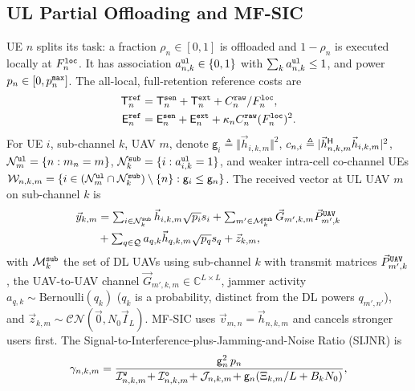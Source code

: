 \documentclass[journal]{IEEEtran}
\begin{document}
\subsection{UL Partial Offloading and MF-SIC}
\label{sec:ul}
UE $n$ splits its task: a fraction $\rho_n\in[0,1]$ is offloaded and $1-\rho_n$ is executed locally at $F_n^{\tt loc}$. It has association $a_{n,k}^{\tt ul}\in\{0,1\}$ with $\sum_k a_{n,k}^{\tt ul}\le 1$, and power $p_n\in[0,p_n^{\tt max}]$. The all-local, full-retention reference costs are
\begin{align}
\mathsf{T}_n^{\tt ref}&=\mathsf{T}_n^{\tt sen}+\mathsf{T}_n^{\tt ext}+C_n^{\tt raw}/F_n^{\tt loc},
\label{eq:ref}\\
\mathsf{E}_n^{\tt ref}&=\mathsf{E}_n^{\tt sen}+\mathsf{E}_n^{\tt ext}+\kappa_n C_n^{\tt raw}(F_n^{\tt loc})^2 .
\nonumber
\end{align}
{For UE $i$, sub-channel $k$, UAV $m$, denote $\mathsf{g}_i\triangleq\Vert\vec{h}_{i,k,m}\Vert^2$, $c_{n,i}\triangleq|\vec{h}_{n,k,m}^{\sf H}\vec{h}_{i,k,m}|^2$, 
$\mathcal{N}_m^{\tt ul}=\{n:m_n=m\}$,
$\mathcal{N}_k^{\tt sub}=\{i:a_{i,k}^{\tt ul}=1\}$, and weaker intra-cell co-channel UEs $\mathcal{W}_{n,k,m}=\{i\in(\mathcal{N}_m^{\tt ul}\cap\mathcal{N}_k^{\tt sub})\setminus\{n\}:\mathsf{g}_i\le\mathsf{g}_n\}$.}
The received vector at UL UAV $m$ on sub-channel $k$ is
\begin{equation}
\begin{aligned}
\textstyle\vec{y}_{k,m}&=\textstyle\sum_{i\in\mathcal{N}_k^{\tt sub}}\vec{h}_{i,k,m}\sqrt{p_i}s_i+\sum_{m'\in\mathcal{M}_k^{\tt sub}}\vec{G}_{m',k,m}\vec{P}_{m',k}^{\tt UAV}\\
&\textstyle+\sum_{q\in\mathcal{Q}}a_{q,k}\vec{h}_{q,k,m}\sqrt{p_q}s_q+\vec{z}_{k,m},
\end{aligned}
\label{eq:ul_y}
\end{equation}
{with $\mathcal{M}_k^{\tt sub}$ the set of DL UAVs using sub-channel $k$ with transmit matrices $\vec{P}_{m',k}^{\tt UAV}$}, the UAV-to-UAV channel $\vec{G}_{m',k,m}\in\mathbb{C}^{L\times L}$, jammer activity $a_{q,k}\sim\mathrm{Bernoulli}(q_k)$ ($q_k$ is a probability, distinct from the DL powers $q_{m',n'}$), and $\vec{z}_{k,m}\sim\mathcal{CN}(\vec{0},N_0\vec{I}_L)$. MF-SIC uses $\vec{v}_{m,n}=\vec{h}_{n,k,m}$ and cancels stronger users first. The Signal-to-Interference-plus-Jamming-and-Noise Ratio (SIJNR) is
\begin{equation}
\gamma_{n,k,m}
=\frac{\mathsf{g}_n^2\, p_n}
{\mathcal{I}_{n,k,m}^{\tt w}\!+\mathcal{I}_{n,k,m}^{\tt o}\!+\mathcal{J}_{n,k,m}
\!+\mathsf{g}_n(\Xi_{k,m}/L+B_kN_0)},
\label{eq:ul_sijnr}
\end{equation}
\end{document}

